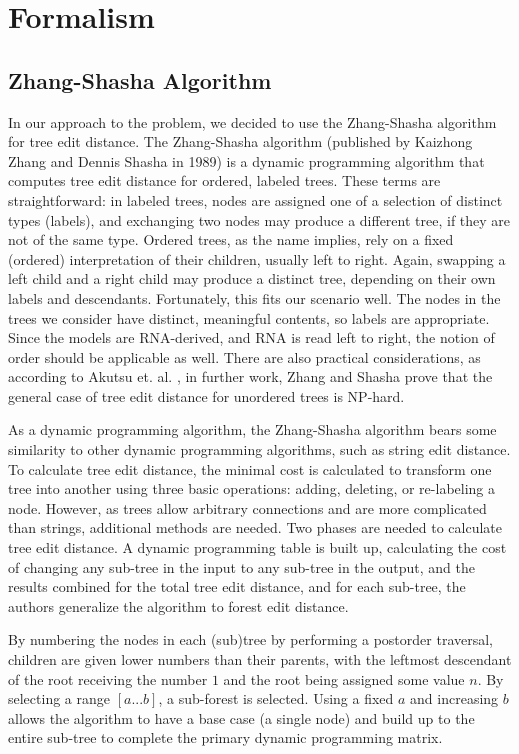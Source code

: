 \section{Formalism}
\label{sec:formalism}


\subsection{Zhang-Shasha Algorithm}
\label{subsec:zhang-shasha}
In our approach to the problem, we decided to use the Zhang-Shasha algorithm for tree edit distance. 
The Zhang-Shasha algorithm \cite{ZSS} (published by Kaizhong Zhang and Dennis Shasha in 1989) is a dynamic programming algorithm
that computes tree edit distance for ordered, labeled trees. These terms are straightforward: in labeled trees, nodes
are assigned one of a selection of distinct types (labels), and exchanging two nodes may produce a different tree,
if they are not of the same type. Ordered trees, as the name implies, rely on a fixed (ordered) interpretation
of their children, usually left to right. Again, swapping a left child and a right child may produce a distinct
tree, depending on their own labels and descendants. Fortunately, this fits our scenario well. The nodes in the
trees we consider have distinct, meaningful contents, so labels are appropriate. Since the models are RNA-derived,
and RNA is read left to right, the notion of order should be applicable as well. There are also practical considerations,
as according to Akutsu et. al. \cite{ExactAlg}, in further work, Zhang and Shasha prove that the general case of tree edit distance 
for unordered trees is NP-hard. 

As a dynamic programming algorithm, the Zhang-Shasha algorithm bears some similarity to other dynamic programming 
algorithms, such as string edit distance. To calculate tree edit distance, the minimal cost is calculated to transform
one tree into another using three basic operations: adding, deleting, or re-labeling a node. However, as trees allow 
arbitrary connections and are more complicated than strings, additional methods are needed. Two phases are needed
to calculate tree edit distance. A dynamic programming table is built up, calculating the cost of changing any
sub-tree in the input to any sub-tree in the output, and the results combined for the total tree edit distance, 
and for each sub-tree, the authors generalize the algorithm to forest edit distance. 

By numbering the nodes in each (sub)tree by performing a postorder traversal, children are given lower numbers 
than their parents, with the leftmost descendant of the root receiving the number $1$ and the root being assigned
some value $n$. By selecting a range $[a...b]$, a sub-forest is selected. Using a fixed $a$ and increasing $b$ allows
the algorithm to have a base case (a single node) and build up to the entire sub-tree to complete the primary 
dynamic programming matrix. 

